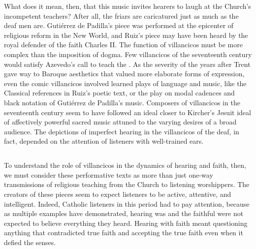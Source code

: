 
What does it mean, then, that this music invites hearers to laugh at the
Church's incompetent teachers? 
After all, the friars are caricatured just as much as the deaf men are.
Gutiérrez de Padilla's piece was performed at the epicenter of religious reform
in the New World, and Ruiz's piece may have been heard by the royal defender of
the faith Charles II.  
The function of villancicos must be more complex than the imposition of dogma.
Few villancicos of the seventeenth century would satisfy Azevedo's call to teach
the .  
As the severity of the years after Trent gave way to Baroque aesthetics that
valued more elaborate forms of expression, even the comic villancicos involved
learned plays of language and music, like the Classical references in Ruiz's
poetic text, or the play on modal cadences and black notation of Gutiérrez de
Padilla's music.
Composers of villancicos in the seventeenth century seem to have followed an
ideal closer to Kircher's Jesuit ideal of affectively powerful sacred music
attuned to the varying desires of a broad audience.
The depictions of imperfect hearing in the villancicos of the deaf, in fact,
depended on the attention of listeners with well-trained ears.


\subsection{}

To understand the role of villancicos in the dynamics of hearing and faith,
then, we must consider these performative texts as more than just one-way
transmissions of religious teaching from the Church to listening worshippers.
The creators of these pieces seem to expect listeners to be active, attentive,
and intelligent.
Indeed, Catholic listeners in this period had to pay attention, because as
multiple examples have demonstrated, hearing was  and the faithful were not expected to believe everything they heard.
Hearing with faith meant questioning anything that contradicted true faith and
accepting the true faith even when it defied the senses.


